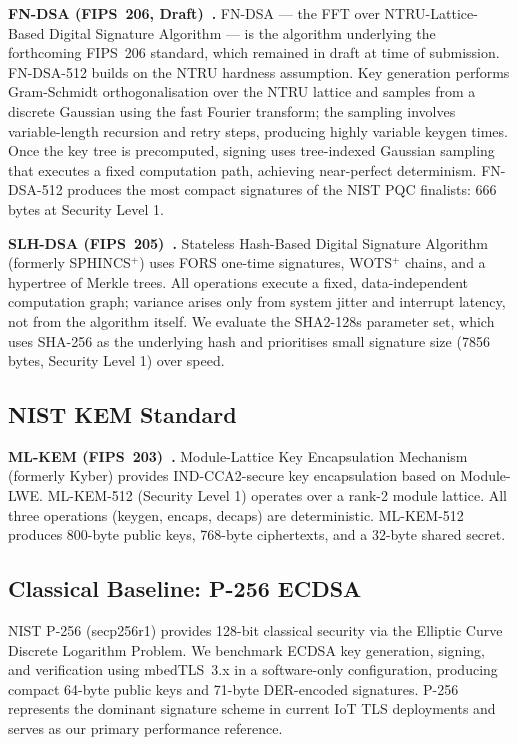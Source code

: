 \documentclass[iicol]{sn-jnl}
\begin{document}
\textbf{FN-DSA (FIPS~206, Draft)~\cite{nist-fips206,falcon-spec}.}
FN-DSA --- the FFT over NTRU-Lattice-Based Digital Signature Algorithm
--- is the algorithm underlying the forthcoming FIPS~206 standard,
which remained in draft at time of submission.
FN-DSA-512 builds on the NTRU hardness assumption.
Key generation performs Gram-Schmidt orthogonalisation over the NTRU
lattice and samples from a discrete Gaussian using the fast Fourier
transform; the sampling involves variable-length recursion and retry
steps, producing highly variable keygen times.
Once the key tree is precomputed, signing uses tree-indexed Gaussian
sampling that executes a fixed computation path, achieving near-perfect
determinism.
FN-DSA-512 produces the most compact signatures of the NIST PQC
finalists: 666 bytes at Security Level 1.

\textbf{SLH-DSA (FIPS~205)~\cite{nist-fips205,sphincsplus-spec}.}
Stateless Hash-Based Digital Signature Algorithm (formerly SPHINCS$^+$)
uses FORS one-time signatures, WOTS$^+$ chains, and a hypertree of
Merkle trees.
All operations execute a fixed, data-independent computation graph;
variance arises only from system jitter and interrupt latency, not
from the algorithm itself.
We evaluate the SHA2-128s parameter set, which uses SHA-256 as the
underlying hash and prioritises small signature size (7856 bytes,
Security Level 1) over speed.

\subsection{NIST KEM Standard}

\textbf{ML-KEM (FIPS~203)~\cite{nist-fips203}.}
Module-Lattice Key Encapsulation Mechanism (formerly Kyber) provides
IND-CCA2-secure key encapsulation based on Module-LWE.
ML-KEM-512 (Security Level 1) operates over a rank-2 module lattice.
All three operations (keygen, encaps, decaps) are deterministic.
ML-KEM-512 produces 800-byte public keys, 768-byte ciphertexts, and
a 32-byte shared secret.

\subsection{Classical Baseline: P-256 ECDSA}

NIST P-256 (secp256r1) provides 128-bit classical security via the
Elliptic Curve Discrete Logarithm Problem.
We benchmark ECDSA key generation, signing, and verification using mbedTLS~3.x
in a software-only configuration, producing compact 64-byte public keys and
71-byte DER-encoded signatures.
P-256 represents the dominant signature scheme in current IoT TLS
deployments and serves as our primary performance reference.
\end{document}
